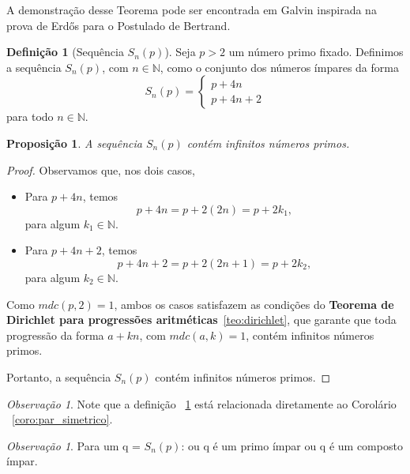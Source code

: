 \documentclass[a4paper,11pt]{article}
\newtheorem{proposition}[theorem]{Proposição}
\theoremstyle{definition}
\newtheorem{definition}[theorem]{Definição}
\theoremstyle{remark}
\newtheorem{remark}[theorem]{Observação}
\begin{document}
\begin{otherlanguage}{brazil}
	A demonstração desse Teorema pode ser encontrada em Galvin \cite{Galvin2013} inspirada na prova de Erdős para o Postulado de Bertrand.
	
	
	\begin{definition}[Sequência \(S_n(p)\)]\label{def:snp}
		Seja \(p > 2\) um número primo fixado. Definimos a sequência \(S_n(p)\), com \(n \in \mathbb{N}\), como o conjunto dos números ímpares da forma
		\[
		S_n(p) = 
		\begin{cases}
			p + 4n \\
			p + 4n + 2
		\end{cases}
		\]
		para todo \(n \in \mathbb{N}\).
	\end{definition}
	
	\vspace{0.5cm}
	
	\begin{proposition}
		A sequência \(S_n(p)\) contém infinitos números primos.
	\end{proposition}
	
	\begin{proof}
		Observamos que, nos dois casos,
		\begin{itemize}
			\item Para \(p + 4n\), temos
			\[
			p + 4n = p + 2(2n) = p + 2k_1,
			\]
			para algum \(k_1 \in \mathbb{N}\).
			
			\item Para \(p + 4n + 2\), temos
			\[
			p + 4n + 2 = p + 2(2n + 1) = p + 2k_2,
			\]
			para algum \(k_2 \in \mathbb{N}\).
		\end{itemize}
		
		Como \(mdc(p, 2) = 1\), ambos os casos satisfazem as condições do  \textbf{Teorema de Dirichlet para progressões aritméticas}~\ref{teo:dirichlet}, que garante que toda progressão da forma \(a + kn\), com \(mdc(a, k) = 1\), contém infinitos números primos.
		
		Portanto, a sequência \(S_n(p)\) contém infinitos números primos.
	\end{proof}
	
	\begin{remark}
		Note que a definição ~\ref{def:snp} está relacionada diretamente ao Corolário ~\ref{coro:par_simetrico}.
	\end{remark}
	
	\begin{remark}
		Para um q = \(S_n(p)\): ou q é um primo ímpar ou q é um composto ímpar.
	\end{remark}
	

\end{otherlanguage}
\end{document}
